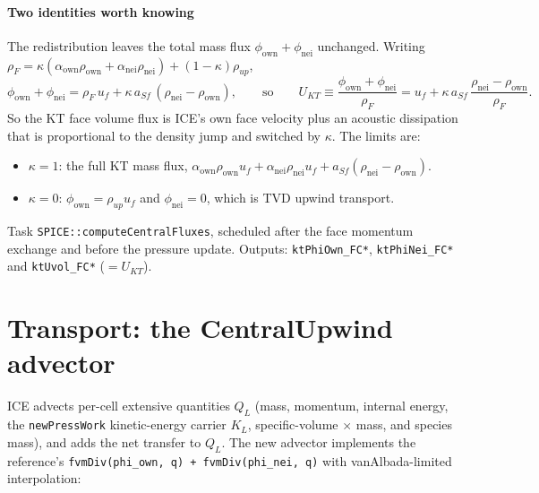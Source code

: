 \documentclass[11pt]{article}
\newcommand{\code}[1]{\texttt{\small #1}}
\newcommand{\own}{\mathrm{own}}
\newcommand{\nei}{\mathrm{nei}}
\begin{document}
\paragraph{Two identities worth knowing}
The redistribution leaves the total mass flux $\phi_\own+\phi_\nei$ unchanged. Writing
$\rho_F = \kappa(\alpha_\own\rho_\own+\alpha_\nei\rho_\nei)+(1-\kappa)\rho_{up}$,
\begin{equation}
  \phi_\own+\phi_\nei = \rho_F\,u_f + \kappa\,a_{Sf}\,(\rho_\nei-\rho_\own),
  \qquad\text{so}\qquad
  U_{KT} \equiv \frac{\phi_\own+\phi_\nei}{\rho_F} = u_f + \kappa\,a_{Sf}\,\frac{\rho_\nei-\rho_\own}{\rho_F}.
  \label{eq:ukt}
\end{equation}
So the KT face volume flux is ICE's own face velocity plus an acoustic dissipation that
is proportional to the density jump and switched by $\kappa$. The limits are:
\begin{itemize}
  \item $\kappa=1$: the full KT mass flux, $\alpha_\own\rho_\own u_f + \alpha_\nei\rho_\nei u_f + a_{Sf}(\rho_\nei-\rho_\own)$.
  \item $\kappa=0$: $\phi_\own=\rho_{up}u_f$ and $\phi_\nei=0$, which is TVD upwind transport.
\end{itemize}

\begin{incode}
Task \code{SPICE::computeCentralFluxes}, scheduled after the face momentum exchange and before
the pressure update. Outputs: \code{ktPhiOwn\_FC*}, \code{ktPhiNei\_FC*} and \code{ktUvol\_FC*}
($=U_{KT}$).
\end{incode}

\section{Transport: the CentralUpwind advector}\label{sec:adv}

ICE advects per-cell extensive quantities $Q_L$ (mass, momentum, internal energy,
the \code{newPressWork} kinetic-energy carrier $K_L$, specific-volume $\times$ mass, and
species mass), and adds the net transfer to $Q_L$. The new advector implements the
reference's \code{fvmDiv(phi\_own, q) + fvmDiv(phi\_nei, q)} with vanAlbada-limited
interpolation:
\end{document}
